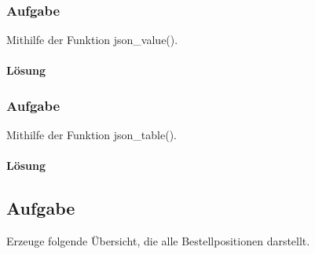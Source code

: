 \subsubsection{Aufgabe}
\label{sec:uebung_10.aufgabe_01a}
Mithilfe der Funktion json\_value().

\paragraph*{Lösung}
\label{sec:uebung_10.aufgabe_01a.loesung}


\subsubsection{Aufgabe}
\label{sec:uebung_10.aufgabe_01b}
Mithilfe der Funktion json\_table().

\paragraph*{Lösung}
\label{sec:uebung_10.aufgabe_01b.loesung}


\subsection{Aufgabe}
\label{sec:uebung_10.aufgabe_02}
Erzeuge folgende Übersicht, die alle Bestellpositionen darstellt.

